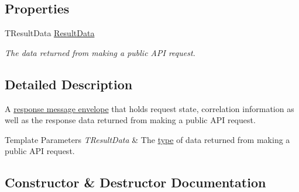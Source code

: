 \subsection*{Properties}
\begin{DoxyCompactItemize}
\item 
T\+Result\+Data \hyperlink{classCqrs_1_1Services_1_1ServiceResponseWithResultData_ab0768d40341eb667f362e5ddc8412810_ab0768d40341eb667f362e5ddc8412810}{Result\+Data}
\begin{DoxyCompactList}\small\item\em The data returned from making a public A\+PI request. \end{DoxyCompactList}\end{DoxyCompactItemize}


\subsection{Detailed Description}
A \hyperlink{interfaceCqrs_1_1Services_1_1IServiceResponse}{response message envelope} that holds request state, correlation information as well as the response data returned from making a public A\+PI request. 


\begin{DoxyTemplParams}{Template Parameters}
{\em T\+Result\+Data} & The \hyperlink{}{type} of data returned from making a public A\+PI request.\\
\hline
\end{DoxyTemplParams}


\subsection{Constructor \& Destructor Documentation}
\mbox{\label{classCqrs_1_1Services_1_1ServiceResponseWithResultData_a4241511df21804b73baec2b0c2e66402_a4241511df21804b73baec2b0c2e66402}} 
